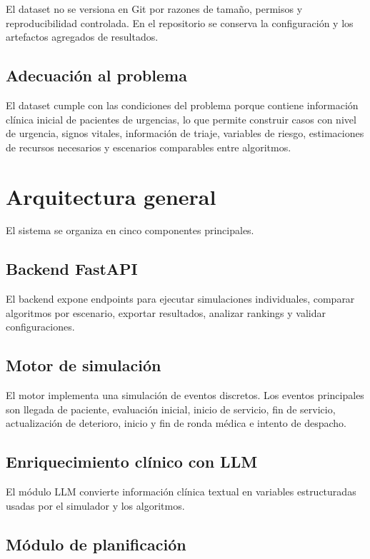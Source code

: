 \documentclass[12pt,a4paper]{article}
\begin{document}
El dataset no se versiona en Git por razones de tamaño, permisos y reproducibilidad controlada. En el repositorio se conserva la configuración y los artefactos agregados de resultados.

\subsection{Adecuación al problema}

El dataset cumple con las condiciones del problema porque contiene información clínica inicial de pacientes de urgencias, lo que permite construir casos con nivel de urgencia, signos vitales, información de triaje, variables de riesgo, estimaciones de recursos necesarios y escenarios comparables entre algoritmos.

\section{Arquitectura general}

El sistema se organiza en cinco componentes principales.

\subsection{Backend FastAPI}

El backend expone endpoints para ejecutar simulaciones individuales, comparar algoritmos por escenario, exportar resultados, analizar rankings y validar configuraciones.

\subsection{Motor de simulación}

El motor implementa una simulación de eventos discretos. Los eventos principales son llegada de paciente, evaluación inicial, inicio de servicio, fin de servicio, actualización de deterioro, inicio y fin de ronda médica e intento de despacho.

\subsection{Enriquecimiento clínico con LLM}

El módulo LLM convierte información clínica textual en variables estructuradas usadas por el simulador y los algoritmos.

\subsection{Módulo de planificación}
\end{document}
